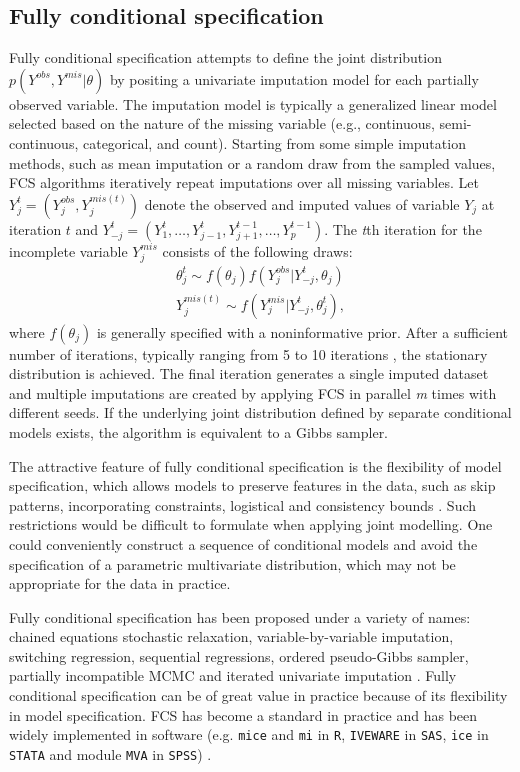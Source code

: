 	\subsection{Fully conditional specification}
	Fully conditional specification attempts to define the joint distribution\\$p(Y^{obs}, Y^{mis}|\theta)$ by positing a univariate imputation model for each partially observed variable. The imputation model is typically a generalized linear model selected based on the nature of the missing variable (e.g., continuous, semi-continuous, categorical, and count). Starting from some simple imputation methods, such as mean imputation or a random draw from the sampled values, FCS algorithms iteratively repeat imputations over all missing variables. Let $Y_{j}^{t} = (Y_{j}^{obs}, Y_{j}^{mis(t)})$ denote the observed and imputed values of variable $Y_{j}$ at iteration $t$ and $Y_{-j}^{t} = (Y_{1}^{t}, \dots, Y_{j-1}^{t}, Y_{j+1}^{t-1}, \dots, Y_{p}^{t-1})$. The \emph{t}th iteration for the incomplete variable \emph{$Y_{j}^{mis}$} consists of the following draws:
	\begin{align*}
		\theta_{j}^{t} \sim f(\theta_{j})f(Y_{j}^{obs}|Y_{-j}^{t}, \theta_{j})\\
		Y_{j}^{mis(t)} \sim f(Y_{j}^{mis}|Y_{-j}^{t}, \theta_{j}^{t}),
	\end{align*}
	where $f(\theta_{j})$ is generally specified with a noninformative prior. After a sufficient number of iterations, typically ranging from 5 to 10 iterations \citep{Buuren2018, oberman2020missing}, the stationary distribution is achieved. The final iteration generates a single imputed dataset and multiple imputations are created by applying FCS in parallel \emph{m} times with different seeds. If the underlying joint distribution defined by separate conditional models exists, the algorithm is equivalent to a Gibbs sampler. 
	
	The attractive feature of fully conditional specification is the flexibility of model specification, which allows models to preserve features in the data, such as skip patterns, incorporating constraints, logistical and consistency bounds \citep{van2007multiple}. Such restrictions would be difficult to formulate when applying joint modelling. One could conveniently construct a sequence of conditional models and avoid the specification of a parametric multivariate distribution, which may not be appropriate for the data in practice.
	
	Fully conditional specification has been proposed under a variety of names: chained equations stochastic relaxation, variable-by-variable imputation, switching regression, sequential regressions, ordered pseudo-Gibbs sampler, partially incompatible MCMC and iterated univariate imputation \citep[Section 4.5.1]{Buuren2018}. Fully conditional specification can be of great value in practice because of its flexibility in model specification. FCS has become a standard in practice and has been widely implemented in software (e.g. \texttt{mice} and \texttt{mi} in \texttt{R}, \texttt{IVEWARE} in \texttt{SAS}, \texttt{ice} in \texttt{STATA} and module \texttt{MVA} in \texttt{SPSS}) \citep{Buuren2011}.
	
